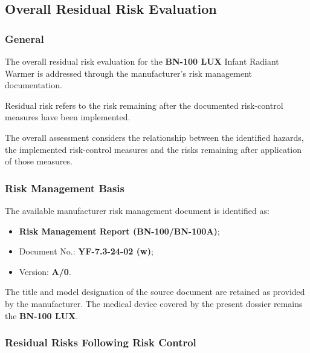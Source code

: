 
\hypertarget{p3-4-4}{}

\subsection{Overall Residual Risk Evaluation}

\subsubsection{General}

The overall residual risk evaluation for the \textbf{BN-100 LUX} Infant
Radiant Warmer is addressed through the manufacturer's risk management
documentation.

Residual risk refers to the risk remaining after the documented
risk-control measures have been implemented.

The overall assessment considers the relationship between the identified
hazards, the implemented risk-control measures and the risks remaining
after application of those measures.

\subsubsection{Risk Management Basis}

The available manufacturer risk management document is identified as:

\begin{itemize}

    \item \textbf{Risk Management Report (BN-100/BN-100A)};

    \item Document No.: \textbf{YF-7.3-24-02 (w)};

    \item Version: \textbf{A/0}.

\end{itemize}

The title and model designation of the source document are retained as
provided by the manufacturer. The medical device covered by the present
dossier remains the \textbf{BN-100 LUX}.

\subsubsection{Residual Risks Following Risk Control}

